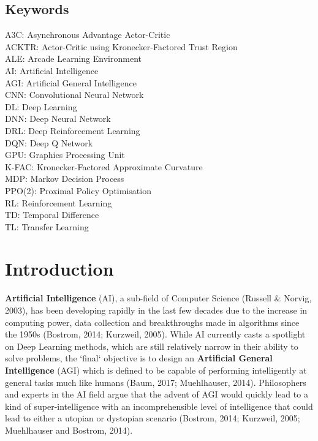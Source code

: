 


\maketitle

\subsection*{Keywords}
A3C: Asynchronous Advantage Actor-Critic\\
ACKTR: Actor-Critic using Kronecker-Factored Trust Region\\
ALE: Arcade Learning Environment\\
AI: Artificial Intelligence\\
AGI: Artificial General Intelligence\\
CNN: Convolutional Neural Network\\
DL: Deep Learning\\
DNN: Deep Neural Network\\
DRL: Deep Reinforcement Learning\\
DQN: Deep Q Network\\
GPU: Graphics Processing Unit\\
K-FAC: Kronecker-Factored Approximate Curvature\\
MDP: Markov Decision Process\\
PPO(2): Proximal Policy Optimisation\\
RL: Reinforcement Learning\\
TD: Temporal Difference\\
TL: Transfer Learning\\

\section{Introduction}

\textbf{Artificial Intelligence} (AI), a sub-field of Computer Science (Russell \& Norvig, 2003), has been developing rapidly in the last few decades due to the increase in computing power, data collection and breakthroughs made in algorithms since the 1950s (Bostrom, 2014; Kurzweil, 2005). While AI currently casts a spotlight on Deep Learning methods, which are still relatively narrow in their ability to solve problems, the `final` objective is to design an \textbf{Artificial General Intelligence} (AGI) which is defined to be capable of performing intelligently at general tasks much like humans (Baum, 2017; Muehlhauser, 2014). Philosophers and experts in the AI field argue that the advent of AGI would quickly lead to a kind of super-intelligence with an incomprehensible level of intelligence that could lead to either a utopian or dystopian scenario (Bostrom, 2014; Kurzweil, 2005; Muehlhauser and Bostrom, 2014). 

